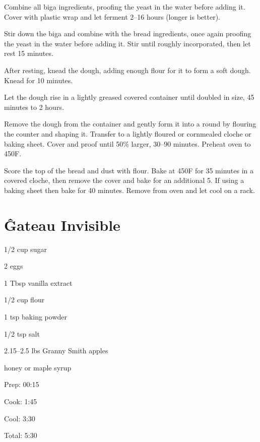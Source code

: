 \documentclass[oneside]{book}  %
\def\thisrecipe{}  %
\newcommand{\recipe}[1]{\section{#1}\def\thisrecipe{: #1}} %
\newcommand{\itemNL}{\item[] \hspace{-\labelsep}}  %
\newcommand{\degF}{\textdegree F\xspace}
\begin{document}
\begin{directions}
  \item Combine all biga ingredients, proofing the yeast in the water before
  adding it. Cover with plastic wrap and let ferment 2--16 hours (longer is
  better).

  \item Stir down the biga and combine with the bread ingredients, once again
  proofing the yeast in the water before adding it. Stir until roughly
  incorporated, then let rest 15 minutes.

  \item After resting, knead the dough, adding enough flour for it to form a
  soft dough. Knead for 10 minutes.

  \item Let the dough rise in a lightly greased covered container until doubled
  in size, 45 minutes to 2 hours.

  \item Remove the dough from the container and gently form it into a round by
  flouring the counter and shaping it. Transfer to a lightly floured or
  cornmealed cloche or baking sheet. Cover and proof until 50\% larger, 30--90
  minutes. Preheat oven to 450\degF.

  \item Score the top of the bread and dust with flour. Bake at 450\degF for 35
  minutes in a covered cloche, then remove the cover and bake for an additional
  5. If using a baking sheet then bake for 40 minutes. Remove from oven and let
  cool on a rack.
\end{directions}
\recipe{\^{G}ateau Invisible} \label{recipe:gateau_invisible} %

\begin{IT}
  \begin{ingredients}
    \item[1/2 cup] sugar
    \item[2] eggs
    \item[1 Tbsp] vanilla extract
    \item[1/2 cup] flour
    \item[1 tsp] baking powder
    \item[1/2 tsp] salt
    \item[2.15--2.5 lbs] Granny Smith apples
    \itemNL honey or maple syrup
  \end{ingredients}

  \switchcolumn

  \begin{timeline}
    \item[Prep:]  00:15
    \item[Cook:]  1:45
    \item[Cool:]  3:30
    \item[Total:] 5:30
  \end{timeline}
\end{IT}
\end{document}
